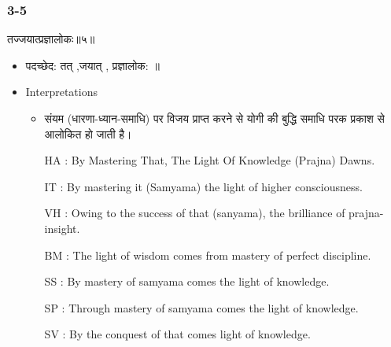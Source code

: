 \begin{frame}[fragile]\frametitle{3-5}
\begin{sanskrit}
तज्जयात्प्रज्ञालोकः॥५॥
\end{sanskrit}

	\begin{itemize}
	\item पदच्छेद: तत् ,जयात् , प्रज्ञालोक: ॥
	\item Interpretations
		\begin{itemize}	
		\item संयम (धारणा-ध्यान-समाधि) पर विजय प्राप्त करने से योगी की बुद्धि समाधि परक प्रकाश से आलोकित हो जाती है।
		\item [HA]: By Mastering That, The Light Of Knowledge (Prajna) Dawns.
		\item [IT]: By mastering it (Samyama) the light of higher consciousness.
		\item [VH]: Owing to the success of that (sanyama), the brilliance of prajna-insight.
		\item [BM]: The light of wisdom comes from mastery of perfect discipline.
		\item [SS]: By mastery of samyama comes the light of knowledge.
		\item [SP]: Through mastery of samyama comes the light of knowledge.
		\item [SV]: By the conquest of that comes light of knowledge. 
		\end{itemize}
	\end{itemize}
\end{frame}



